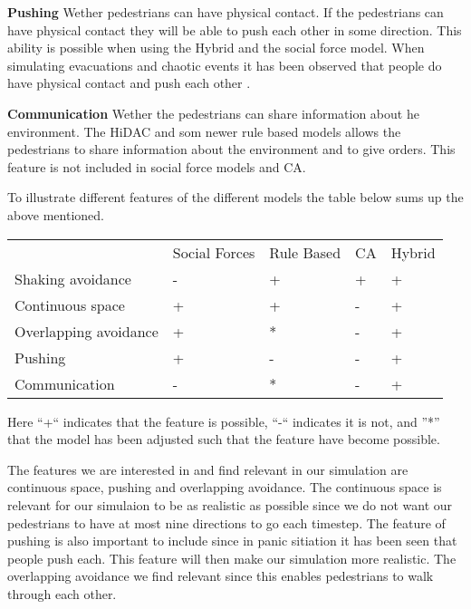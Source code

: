 \textbf{Pushing} Wether pedestrians can have physical contact. If the pedestrians can have physical contact they will be able to push each other in some
direction. This ability is possible when using the Hybrid and the social force model. When simulating evacuations and chaotic events it has been observed
that people do have physical contact and push each other \cite{self-org}.

\textbf{Communication} Wether the pedestrians can share information about he environment. The HiDAC and som newer rule based models allows the pedestrians
to share information about the environment and to give orders. This feature is not included in social force models and CA. \cite{Comparison}

To illustrate different features of the different models the table below sums up the above mentioned.
\begin{center}
\begin{tabular}{lllll}
 & Social Forces & Rule Based & CA & Hybrid\\
Shaking avoidance     & - & + & + & +\\
Continuous space      & + & + & - & +\\
Overlapping avoidance & + & * & - & +\\
Pushing               & + & - & - & +\\
Communication         & - & * & - & +
\end{tabular}
\end{center}
Here ``+`` indicates that the feature is possible, ``-`` indicates it is not, and ''*'' that the model has been adjusted such that the feature have
become possible. \cite{Comparison}

The features we are interested in and find relevant in our simulation are continuous space, pushing and overlapping avoidance. The continuous space is
relevant for our simulaion to be as realistic as possible since we do not want our pedestrians to have at most nine directions to go each timestep.
The feature of pushing is also important to include since in panic sitiation it has been seen that people push each. This feature will then make our
simulation more realistic.
The overlapping avoidance we find relevant since this enables pedestrians to walk through each other.


